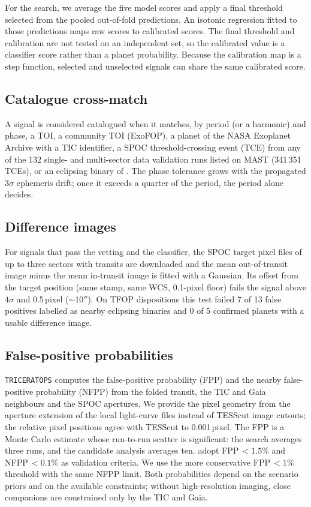 \documentclass{aastex701}
\begin{document}
For the search, we average the five model scores and apply a final threshold selected from the
pooled out-of-fold predictions. An isotonic regression fitted to those predictions maps raw scores
to calibrated scores. The final threshold and calibration are not tested on an independent set,
so the calibrated value is a classifier score rather than a planet probability. Because the
calibration map is a step function, selected and unselected signals can share the same calibrated
score.



\subsection{Catalogue cross-match}
A signal is considered catalogued when it matches, by period (or a harmonic) and phase, a TOI, a
community TOI (ExoFOP), a planet of the NASA Exoplanet Archive with a TIC identifier, a SPOC
threshold-crossing event (TCE) from any of the 132 single- and multi-sector data validation runs
listed on MAST (341\,351 TCEs), or an eclipsing binary of \citet{Prsa2022}. The phase tolerance grows
with the propagated $3\sigma$ ephemeris drift; once it exceeds a quarter of the period, the period
alone decides.

\subsection{Difference images}
For signals that pass the vetting and the classifier, the SPOC target pixel files of up to three
sectors with transits are downloaded and the mean out-of-transit image minus the mean in-transit
image is fitted with a Gaussian. Its offset from the target position (same stamp, same WCS, 0.1-pixel
floor) fails the signal above $4\sigma$ and 0.5\,pixel ($\sim$10$''$). On TFOP dispositions this test
failed 7 of 13 false positives labelled as nearby eclipsing binaries and 0 of 5 confirmed planets with
a usable difference image.

\subsection{False-positive probabilities}
\texttt{TRICERATOPS} \citep{Giacalone2021,Giacalone2022} computes the false-positive probability (FPP)
and the nearby false-positive probability (NFPP) from the folded transit, the TIC and Gaia
neighbours and the SPOC apertures. We provide the pixel geometry from the aperture extension of the
local light-curve files instead of TESScut image cutouts; the relative pixel positions agree with
TESScut to 0.001\,pixel. The FPP is a Monte Carlo estimate whose run-to-run scatter is significant:
the search averages three runs, and the candidate analysis averages ten.
\citet{Giacalone2021} adopt FPP\,$<1.5\%$ and NFPP\,$<0.1\%$ as validation criteria.
We use the more conservative FPP\,$<1\%$ threshold with the same NFPP limit.
Both probabilities depend on the scenario priors and on the available
constraints; without high-resolution imaging, close companions are constrained only by the TIC and
Gaia.
\end{document}
